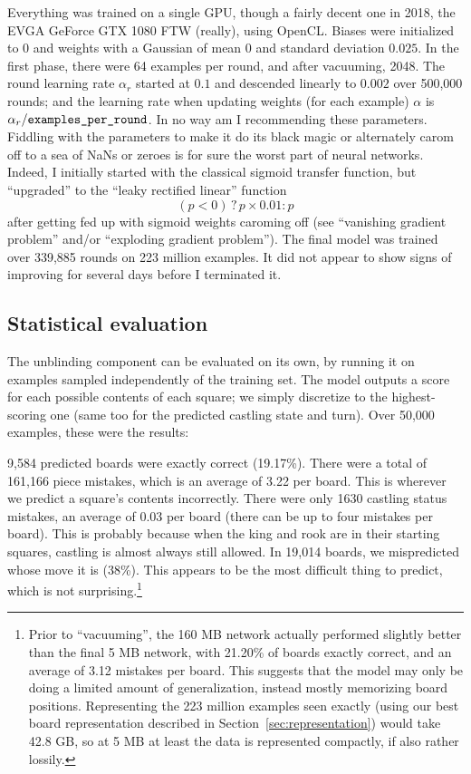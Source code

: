 \documentclass[twocolumn]{amsart}
\begin{document}
Everything was trained on a single GPU, though a fairly decent one in
2018, the EVGA GeForce GTX 1080 FTW (really), using OpenCL. Biases
were initialized to $0$ and weights with a Gaussian of mean $0$ and
standard deviation $0.025$. In the first phase, there were 64 examples
per round, and after vacuuming, 2048. The round learning rate
$\alpha_r$ started at $0.1$ and descended linearly to $0.002$ over
500,000 rounds; and the learning rate when updating weights (for each
example) $\alpha$ is $\alpha_r / \verb+examples_per_round+$. In no way
am I recommending these parameters. Fiddling with the parameters to
make it do its black magic or alternately carom off to a sea of NaNs
or zeroes is for sure the worst part of neural networks. Indeed, I
initially started with the classical sigmoid transfer function, but
``upgraded'' to the ``leaky rectified linear'' function
%
$$(p < 0) \,?\, p \times 0.01 : p$$
%
after getting fed up with sigmoid weights caroming off (see
``vanishing gradient problem'' and/or ``exploding gradient problem'').
The final model was trained over 339,885 rounds on 223 million
examples. It did not appear to show signs of improving for
several days before I terminated it.

\subsection{Statistical evaluation}

The unblinding component can be evaluated on its own, by running it on
examples sampled independently of the training set. The model outputs
a score for each possible contents of each square; we simply
discretize to the highest-scoring one (same too for the predicted
castling state and turn). Over 50,000 examples, these were the
results:

9,584 predicted boards were exactly correct (19.17\%). There were a
total of 161,166 piece mistakes, which is an average of 3.22 per
board. This is wherever we predict a square's contents incorrectly.
There were only 1630 castling status mistakes, an average of 0.03 per
board (there can be up to four mistakes per board). This is probably
because when the king and rook are in their starting squares, castling
is almost always still allowed. In 19,014 boards, we mispredicted
whose move it is (38\%). This appears to be the most difficult thing
to predict, which is not surprising.\footnote{ Prior to ``vacuuming'',
  the 160 MB network actually performed slightly better than the final
  5 MB network, with 21.20\% of boards exactly correct, and an average
  of 3.12 mistakes per board. This suggests that the model may only be
  doing a limited amount of generalization, instead mostly memorizing
  board positions. Representing the 223 million examples seen exactly
  (using our best board representation described in
  Section~\ref{sec:representation}) would take 42.8 GB, so at 5 MB at
  least the data is represented compactly, if also rather lossily.}
\end{document}
